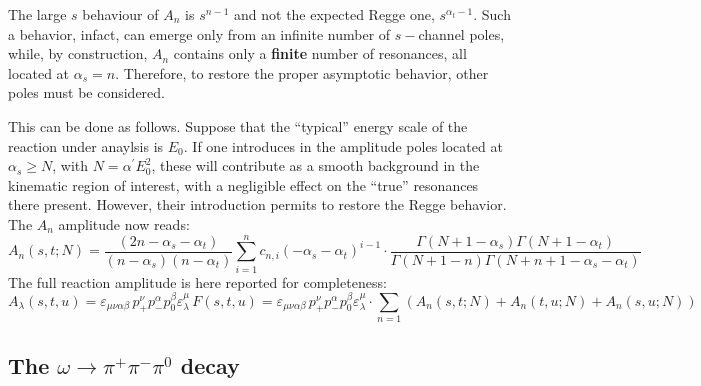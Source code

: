 \documentclass[a4paper,10pt]{report}
\newcommand{\decay}{$\omega \rightarrow \pi^+ \pi^- \pi^0$ }
\begin{document}
The large $s$ behaviour of $A_{n}$ is $s^{n-1}$ and not the expected Regge one, $s^{\alpha_t-1}$. Such a behavior, infact, can emerge only from an infinite number of $s-$channel poles,
while, by construction, $A_{n}$ contains only a \textbf{finite} number of resonances, all located at $\alpha_s=n$. 
Therefore, to restore the proper asymptotic behavior, other poles must be considered. 

This can be done as follows.  Suppose that the ``typical'' energy scale of the reaction under anaylsis is $E_0$. If one introduces in the amplitude poles located at $\alpha_s \geq N$, 
with $N=\alpha^{\prime}E^2_0$, these will contribute as a smooth background in the kinematic region of interest, with a negligible effect on the ``true'' resonances there present.
However, their introduction permits to restore the Regge behavior. The $A_n$ amplitude now reads:
\begin{equation}
A_{n}(s,t;N)=\frac{(2n-\alpha_s-\alpha_t)}{(n-\alpha_s)(n-\alpha_t)}\sum_{i=1}^n c_{n,i} (-\alpha_s-\alpha_t)^{i-1}
\cdot
\frac{\Gamma(N+1-\alpha_s)\Gamma(N+1-\alpha_t)}{\Gamma(N+1-n)\Gamma(N+n+1-\alpha_s-\alpha_t)}
\end{equation}
The full reaction amplitude is here reported for completeness:
\begin{equation}\label{eq:fullampl}
A_\lambda(s,t,u) = \varepsilon_{\mu \nu \alpha \beta}\, p^{\nu}_{+}p^{\alpha}_{-}p^{\beta}_{0}\varepsilon^{\mu}_{\lambda} \, F(s,t,u) 
=
\varepsilon_{\mu \nu \alpha \beta}\, p^{\nu}_{+}p^{\alpha}_{-}p^{\beta}_{0}\varepsilon^{\mu}_{\lambda}
\cdot
\sum_{n=1}(A_{n}(s,t;N)+A_{n}(t,u;N)+A_{n}(s,u;N))
\end{equation}

\subsection{The \decay decay}
\end{document}
